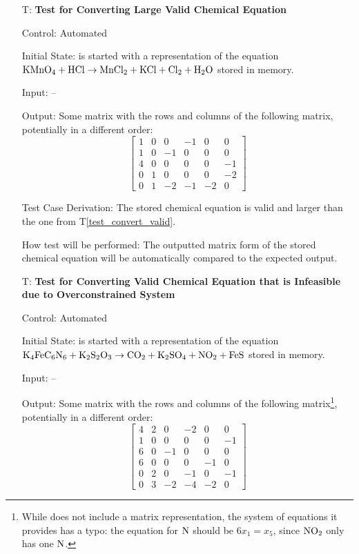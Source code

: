 \documentclass[12pt, titlepage]{article}
\newcounter{testnum} %
\newcommand{\testref}[1]{T\ref{#1}}
\begin{document}
\begin{enumerate}
  \item[T\refstepcounter{testnum}\thetestnum \label{test_convert_large_valid}:]
    \textbf{Test for Converting Large Valid Chemical Equation}

    Control: Automated

    Initial State: \progname{} is started with a representation of the equation
    $\ce{KMnO4} + \ce{HCl} \rightarrow \ce{MnCl2} + \ce{KCl} + \ce{Cl2} +
      \ce{H2O}$ \cite{taylor_balancing_2021} stored in memory.

    Input: --

    Output: Some matrix with the rows and columns of the following matrix,
    potentially in a different order:
    $$\begin{bmatrix}
        1 & 0 & 0  & -1 & 0  & 0  \\
        1 & 0 & -1 & 0  & 0  & 0  \\
        4 & 0 & 0  & 0  & 0  & -1 \\
        0 & 1 & 0  & 0  & 0  & -2 \\
        0 & 1 & -2 & -1 & -2 & 0
      \end{bmatrix}$$

    Test Case Derivation: The stored chemical equation is
    valid and larger than the one from \testref{test_convert_valid}.

    How test will be performed: The outputted matrix form of the stored
    chemical equation will be automatically compared to the expected output.

  \item[T\refstepcounter{testnum}\thetestnum \label{test_convert_inf_over_valid}:]
    \textbf{Test for Converting Valid Chemical Equation that is Infeasible due
      to Overconstrained System}

    Control: Automated

    Initial State: \progname{} is started with a representation of the equation
    $\ce{K4FeC6N6} + \ce{K2S2O3} \rightarrow \ce{CO2} + \ce{K2SO4} + \ce{NO2} +
      \ce{FeS}$ \cite{hamid_balancing_2019} stored in memory.

    Input: --

    Output: Some matrix with the rows and columns of the following
    matrix\footnote{While
      \cite{hamid_balancing_2019} does not include a matrix representation, the
      system of equations it provides has a typo: the equation for $\ce{N}$
      should be $6x_1 = x_5$, since $\ce{NO2}$ only has one $\ce{N}$.},
    potentially in a different order:
    $$\begin{bmatrix}
        4 & 2 & 0  & -2 & 0  & 0  \\
        1 & 0 & 0  & 0  & 0  & -1 \\
        6 & 0 & -1 & 0  & 0  & 0  \\
        6 & 0 & 0  & 0  & -1 & 0  \\
        0 & 2 & 0  & -1 & 0  & -1 \\
        0 & 3 & -2 & -4 & -2 & 0
      \end{bmatrix}$$


\end{enumerate}
\end{document}
